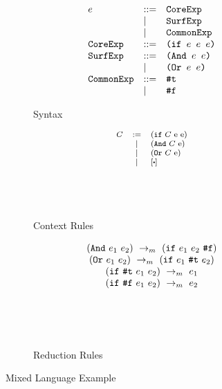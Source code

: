 \begin{figure}[t]
\centering
\begin{subfigure}{0.3\linewidth}{\footnotesize
    \begin{flushleft}
        \[
        \begin{array}{lll}
        e &::=& \mbox{\tt CoreExp} \\
        &|&\mbox{\tt SurfExp}\\
        &|&\mbox{\tt CommonExp}\\
        \mbox{\tt CoreExp} &::=& \texttt{(if~$e$~$e$~$e$)}\\
        \mbox{\tt SurfExp} &::=& \texttt{(And~$e$~$e$)}\\
        &|&\texttt{(Or~$e$~$e$)}\\
        \mbox{\tt CommonExp} &::=& \mbox{\tt \#t}\\
        &|& \mbox{\tt \#f}\\
        \end{array}
        \]
    \end{flushleft}
    \caption{Syntax}
    \label{fig:mixsyntax}
}
\end{subfigure}
\begin{subfigure}{0.2\linewidth}{\footnotesize
    \begin{flushleft}
        \[\footnotesize
        \begin{array}{lcl}
        C &:=& (\m{if}~C~$e$~$e$)\\
        &|& (\m{And}~C~$e$)\\
        &|& (\m{Or}~C~$e$)\\
        &|&[\bigcdot]\\[5em]
        \end{array}
        \]
        \end{flushleft}
    \caption{Context Rules}
    \label{fig:mixcontext}
}
\end{subfigure}
\begin{subfigure}{0.3\linewidth}{\footnotesize
    \begin{flushleft}
        \[
        \begin{array}{c}
        (\mbox{\tt And}~e_1~e_2) ~\rightarrow_m~(\mbox{\tt if}~e_1~e_2~\mbox{\tt \#f})\\
        (\mbox{\tt Or}~e_1~e_2) ~\rightarrow_m~(\mbox{\tt if}~e_1~\mbox{\tt \#t}~e_2)\\
        (\mbox{\tt if}~\mbox{\tt \#t}~e_1~e_2) ~\rightarrow_m~e_1\\
        (\mbox{\tt if}~\mbox{\tt \#f}~e_1~e_2) ~\rightarrow_m~e_2\\[5em]
        \end{array}
        \]
    \end{flushleft}
    \caption{Reduction Rules}
    \label{fig:mixreduction}
}
\end{subfigure}

\caption{Mixed Language Example}
\label{fig:mixexample}
\end{figure}


